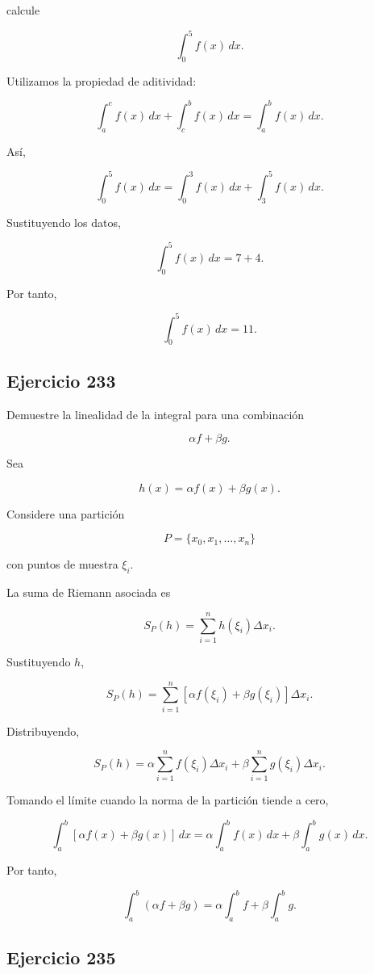 \documentclass[12pt]{article}
\begin{document}
calcule

\[
\int_0^5f(x)\,dx.
\]

Utilizamos la propiedad de aditividad:

\[
\int_a^c f(x)\,dx
+
\int_c^b f(x)\,dx
=
\int_a^b f(x)\,dx.
\]

Así,

\[
\int_0^5f(x)\,dx
=
\int_0^3f(x)\,dx
+
\int_3^5f(x)\,dx.
\]

Sustituyendo los datos,

\[
\int_0^5f(x)\,dx
=
7+4.
\]

Por tanto,

\[
\boxed{
\int_0^5f(x)\,dx=11
}.
\]

\subsection*{Ejercicio 233}

Demuestre la linealidad de la integral para una combinación

\[
\alpha f+\beta g.
\]

Sea

\[
h(x)=\alpha f(x)+\beta g(x).
\]

Considere una partición

\[
P=\{x_0,x_1,\ldots,x_n\}
\]

con puntos de muestra \(\xi_i\).

La suma de Riemann asociada es

\[
S_P(h)
=
\sum_{i=1}^n
h(\xi_i)\Delta x_i.
\]

Sustituyendo \(h\),

\[
S_P(h)
=
\sum_{i=1}^n
[\alpha f(\xi_i)+\beta g(\xi_i)]
\Delta x_i.
\]

Distribuyendo,

\[
S_P(h)
=
\alpha
\sum_{i=1}^n
f(\xi_i)\Delta x_i
+
\beta
\sum_{i=1}^n
g(\xi_i)\Delta x_i.
\]

Tomando el límite cuando la norma de la partición tiende a cero,

\[
\int_a^b
[\alpha f(x)+\beta g(x)]\,dx
=
\alpha\int_a^bf(x)\,dx
+
\beta\int_a^bg(x)\,dx.
\]

Por tanto,

\[
\boxed{
\int_a^b(\alpha f+\beta g)
=
\alpha\int_a^bf
+
\beta\int_a^bg
}.
\]

\subsection*{Ejercicio 235}
\end{document}
